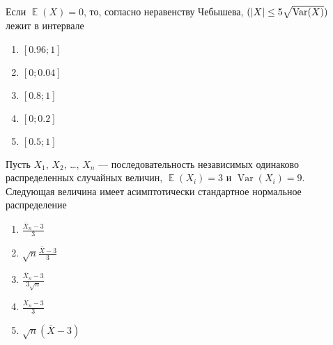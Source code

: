 \documentclass[t]{beamer}
\DeclareMathOperator{\Var}{Var}
\DeclareMathOperator{\E}{\mathbb{E}}
\let\P\relax
\DeclareMathOperator{\P}{\mathbb{P}}
\begin{document}
 \begin{frame} \label{27} 
\begin{block}{27} 

Если $\E(X)=0$, то, согласно неравенству Чебышева, $\P(|X| \leq 5 \sqrt{\Var(X)})$ лежит в интервале
 


 \end{block} 
\begin{enumerate} 
\item[] \hyperlink{27-Yes}{\beamergotobutton{} $[0.96;1]$ }
\item[] \hyperlink{27-No}{\beamergotobutton{} $[0;0.04]$}
\item[] \hyperlink{27-No}{\beamergotobutton{} $[0.8;1]$}
\item[] \hyperlink{27-No}{\beamergotobutton{} $[0;0.2]$}
\item[] \hyperlink{27-No}{\beamergotobutton{} $[0.5;1]$
}
\end{enumerate} 
\end{frame} 


 \begin{frame} \label{28} 
\begin{block}{28} 

Пусть $X_1$, $X_2$, \ldots, $X_n$ — последовательность независимых одинаково распределенных случайных величин, $\E(X_i)=3$ и $\Var(X_i)=9$. Следующая величина имеет асимптотически стандартное нормальное распределение
 


 \end{block} 
\begin{enumerate} 
\item[] \hyperlink{28-No}{\beamergotobutton{} $\frac{\bar{X}_n-3}{3}$}
\item[] \hyperlink{28-Yes}{\beamergotobutton{} $\sqrt{n}\frac{\bar{X}-3}{3}$}
\item[] \hyperlink{28-No}{\beamergotobutton{} $\frac{\bar{X}_n-3}{3\sqrt{n}}$}
\item[] \hyperlink{28-No}{\beamergotobutton{} $\frac{X_n-3}{3}$ }
\item[] \hyperlink{28-No}{\beamergotobutton{} $\sqrt{n}(\bar{X}-3)$ }
\end{enumerate} 
\end{frame} 
\end{document}
